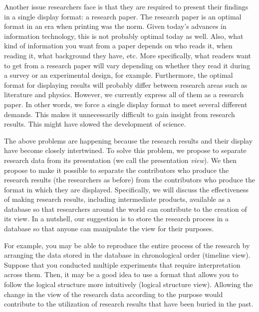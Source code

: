 \documentclass{article}
\begin{document}
Another issue researchers face is that they are required to present their findings in a single display format: a research paper. The research paper is an optimal format in an era when printing was the norm. Given today’s advances in information technology, this is not probably optimal today as well. Also, what kind of information you want from a paper depends on who reads it, when reading it, what background they have, etc. More specifically, what readers want to get from a research paper will vary depending on whether they read it during a survey or an experimental design, for example. Furthermore, the optimal format for displaying results will probably differ between research areas such as literature and physics. However, we currently express all of them as a research paper. In other words, we force a single display format to meet several different demands. This makes it unnecessarily difficult to gain insight from research results. This might have slowed the development of science.

The above problems are happening because the research results and their display have become closely intertwined. To solve this problem, we propose to separate research data from its presentation (we call the presentation \textit{view}). We then propose to make it possible to separate the contributors who produce the research results (the researchers as before) from the contributors who produce the format in which they are displayed. Specifically, we will discuss the effectiveness of making research results, including intermediate products, available as a database so that researchers around the world can contribute to the creation of its view. In a nutshell, our suggestion is to store the research process in a database so that anyone can manipulate the view for their purposes.

For example, you may be able to reproduce the entire process of the research by arranging the data stored in the database in chronological order (timeline view). Suppose that you conducted multiple experiments that require interpretation across them. Then, it may be a good idea to use a format that allows you to follow the logical structure more intuitively (logical structure view). Allowing the change in the view of the research data according to the purpose would contribute to the utilization of research results that have been buried in the past.
\end{document}

